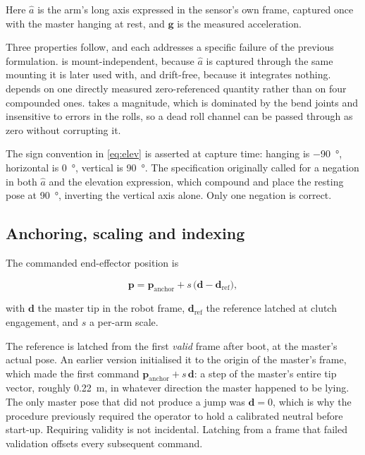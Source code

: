 Here $\hat{a}$ is the arm's long axis expressed in the sensor's own frame,
captured once with the master hanging at rest, and $\mathbf{g}$ is the
measured acceleration.

Three properties follow, and each addresses a specific failure of the previous
formulation.  is mount-independent, because $\hat{a}$ is
captured through the same mounting it is later used with, and drift-free,
because it integrates nothing.  depends on one directly measured
zero-referenced quantity rather than on four compounded ones.
 takes a magnitude, which is dominated by the bend joints and
insensitive to errors in the rolls, so a dead roll channel can be passed
through as zero without corrupting it.

The sign convention in \cref{eq:elev} is asserted at capture time: hanging is
\SI{-90}{\degree}, horizontal is \SI{0}{\degree}, vertical is
\SI{+90}{\degree}. The specification originally called for a negation in both
$\hat{a}$ and the elevation expression, which compound and place the resting
pose at \SI{+90}{\degree}, inverting the vertical axis alone. Only one
negation is correct.

\subsection{Anchoring, scaling and indexing}

The commanded end-effector position is

\begin{equation}
  \mathbf{p} = \mathbf{p}_{\text{anchor}} + s\,\bigl(\mathbf{d} - \mathbf{d}_{\text{ref}}\bigr),
  \label{eq:anchor}
\end{equation}

with $\mathbf{d}$ the master tip in the robot frame, $\mathbf{d}_{\text{ref}}$
the reference latched at clutch engagement, and $s$ a per-arm scale.

The reference is latched from the first \emph{valid} frame after boot, at the
master's actual pose. An earlier version initialised it to the origin of the
master's frame, which made the first command $\mathbf{p}_{\text{anchor}} +
s\,\mathbf{d}$: a step of the master's entire tip vector, roughly
\SI{0.22}{\metre}, in whatever direction the master happened to be lying. The
only master pose that did not produce a jump was $\mathbf{d} = 0$, which is
why the procedure previously required the operator to hold a calibrated
neutral before start-up. Requiring validity is not incidental. Latching from a
frame that failed validation offsets every subsequent command.

